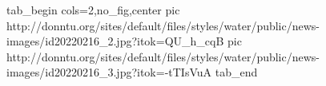  
 
 
 
 


\ifcmt
  tab_begin cols=2,no_fig,center
     pic http://donntu.org/sites/default/files/styles/water/public/news-images/id20220216_2.jpg?itok=QU_h_cqB
		 pic http://donntu.org/sites/default/files/styles/water/public/news-images/id20220216_3.jpg?itok=-tTIsVuA
  tab_end
\fi
